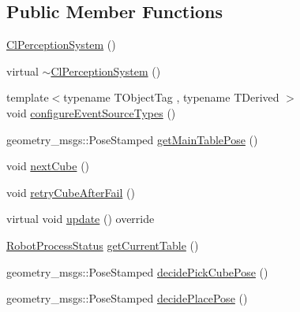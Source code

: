 \subsection*{Public Member Functions}
\begin{DoxyCompactItemize}
\item 
\hyperlink{classsm__moveit__4_1_1cl__perception__system_1_1ClPerceptionSystem_aeb969985d995c4ba91f1f2f693fe2c3a}{Cl\+Perception\+System} ()
\item 
virtual \hyperlink{classsm__moveit__4_1_1cl__perception__system_1_1ClPerceptionSystem_aa914df8a54f247c92cb0e7c3568b9e44}{$\sim$\+Cl\+Perception\+System} ()
\item 
{\footnotesize template$<$typename T\+Object\+Tag , typename T\+Derived $>$ }\\void \hyperlink{classsm__moveit__4_1_1cl__perception__system_1_1ClPerceptionSystem_a693927b659a3f739f2bc2ac403df0f1a}{configure\+Event\+Source\+Types} ()
\item 
geometry\+\_\+msgs\+::\+Pose\+Stamped \hyperlink{classsm__moveit__4_1_1cl__perception__system_1_1ClPerceptionSystem_a234d70a76bb5bf73f23d420c2b541632}{get\+Main\+Table\+Pose} ()
\item 
void \hyperlink{classsm__moveit__4_1_1cl__perception__system_1_1ClPerceptionSystem_adb892199c1e7eb48d41e501a2b0ec5e8}{next\+Cube} ()
\item 
void \hyperlink{classsm__moveit__4_1_1cl__perception__system_1_1ClPerceptionSystem_a060df4809e44b378878819c884e86fb8}{retry\+Cube\+After\+Fail} ()
\item 
virtual void \hyperlink{classsm__moveit__4_1_1cl__perception__system_1_1ClPerceptionSystem_a91de8cf71c93738f8bcbea388c84a5dd}{update} () override
\item 
\hyperlink{namespacesm__moveit__4_1_1cl__perception__system_a11dfa58fc66f2d368b894a9f1fec870e}{Robot\+Process\+Status} \hyperlink{classsm__moveit__4_1_1cl__perception__system_1_1ClPerceptionSystem_aa08e0d656ca31a618c0a4c496afe36af}{get\+Current\+Table} ()
\item 
geometry\+\_\+msgs\+::\+Pose\+Stamped \hyperlink{classsm__moveit__4_1_1cl__perception__system_1_1ClPerceptionSystem_ab4abc387e9053b62464a542378d779e5}{decide\+Pick\+Cube\+Pose} ()
\item 
geometry\+\_\+msgs\+::\+Pose\+Stamped \hyperlink{classsm__moveit__4_1_1cl__perception__system_1_1ClPerceptionSystem_ab2431f4f2f48fc474e7b2f868bdec60d}{decide\+Place\+Pose} ()
\end{DoxyCompactItemize}
